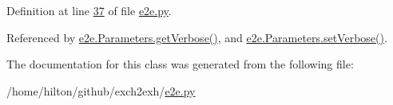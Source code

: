 Definition at line \hyperlink{e2e_8py_source_l00037}{37} of file \hyperlink{e2e_8py_source}{e2e.\+py}.



Referenced by \hyperlink{e2e_8py_source_l00114}{e2e.\+Parameters.\+get\+Verbose()}, and \hyperlink{e2e_8py_source_l00111}{e2e.\+Parameters.\+set\+Verbose()}.



The documentation for this class was generated from the following file\+:\begin{DoxyCompactItemize}
\item 
/home/hilton/github/exch2exh/\hyperlink{e2e_8py}{e2e.\+py}\end{DoxyCompactItemize}
